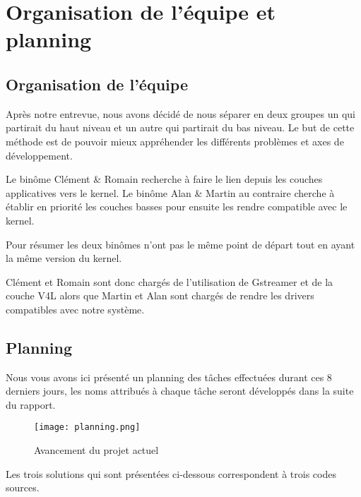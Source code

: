 
\chapter{Organisation de l'équipe et planning} %

\label{Chapter1} %


\section{Organisation de l'équipe}

Après notre entrevue, nous avons décidé de nous séparer en deux groupes un qui
partirait du haut niveau et un autre qui partirait du bas niveau. Le but de
cette méthode est de pouvoir mieux appréhender les différents problèmes et axes
de développement. 

Le binôme Clément \& Romain recherche à faire le lien depuis
les couches applicatives vers le kernel. Le binôme Alan \& Martin au contraire
cherche à établir en priorité les couches basses pour ensuite les rendre
compatible avec le kernel.

Pour résumer les deux binômes n’ont pas le même point de départ tout en ayant la même version du kernel.

Clément et Romain sont donc chargés de l’utilisation de Gstreamer et de la
couche V4L alors que Martin et Alan sont chargés de rendre les drivers
compatibles avec notre système.

\section{Planning}

Nous vous avons ici présenté un planning des tâches effectuées durant ces 8 \\
derniers jours, les noms attribués à chaque tâche seront développés dans la suite du rapport.

\begin{figure}[th]
    \centering
    \texttt{[image: planning.png]}
    \decoRule
    \caption{Avancement du projet actuel}  \label{fig:planning}
\end{figure}

Les trois solutions qui sont présentées ci-dessous correspondent à trois codes sources.


